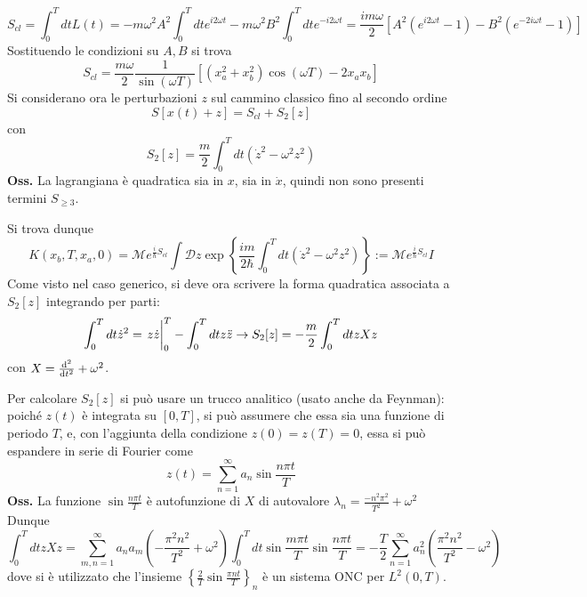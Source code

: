 $$S_{cl} = \int_{0}^{T}dt L(t) = -m\omega^2A^2\int_{0}^{T}dte^{i2\omega t} -
m\omega^2B^2\int_{0}^{T}dte^{-i2\omega t} =
\frac{im\omega}{2}\left[A^2(e^{i2\omega t} -1) - B^2(e^{-2i\omega t} -1)\right]$$
Sostituendo le condizioni su $A,B$ si trova
$$S_{cl}=\frac{m\omega}{2}\frac{1}{\sin(\omega T)}\left[(x_a^2+x_b^2)\cos(\omega T) - 2x_ax_b\right]$$
Si considerano ora le perturbazioni $z$ sul cammino classico fino al secondo ordine
$$S[x(t)+z] = S_{cl} + S_2[z]$$
con
$$S_2[z] = \frac{m}{2}\int_{0}^{T}dt(\dot z^2-\omega^2z^2)$$
\textbf{Oss.} La lagrangiana è quadratica sia in $x$, sia in $\dot x$, quindi non sono presenti
termini $S_{\geq3}$.

Si trova dunque
$$K(x_b,T,x_a,0) = \mathcal{M}e^{\frac{i}{\hbar}S_{cl}} \int\mathcal{D}z
\exp\left\{\frac{im}{2\hbar}\int_{0}^{T}dt (\dot z^2-\omega^2z^2)\right\} :=
\mathcal{M}e^{\frac{i}{\hbar}S_{cl}}I$$
Come visto nel caso generico, si deve ora scrivere la forma quadratica associata a $S_2[z]$ integrando
per parti:
$$\int_{0}^{T}dt \dot z^2 = \eval{z\dot z}_0^T - \int_{0}^{T}dtz\ddot z
\to S_2[z] = -\frac{m}{2}\int_{0}^{T}dt zXz$$
con $X = \dv[2]{}{t} + \omega^2$.

Per calcolare $S_2[z]$ si può usare un trucco analitico (usato anche da Feynman):
poiché $z(t)$ è integrata su $[0,T]$, si può assumere che essa sia una funzione di periodo $T$, e,
con l'aggiunta della condizione $z(0)=z(T)=0$, essa si può espandere in serie di Fourier come
$$z(t)=\sum_{n=1}^{\infty}a_n\sin\frac{n\pi t}{T}$$
\textbf{Oss.} La funzione $\sin\frac{n\pi t}{T}$ è autofunzione di $X$ di autovalore
$\lambda_n = \frac{-n^2\pi^2}{T^2} + \omega^2$\\
Dunque
$$\int_{0}^{T}dtzXz = \sum_{m,n=1}^{\infty}a_na_m\left(-\frac{\pi^2n^2}{T^2}+\omega^2\right)
\int_{0}^{T}dt\sin\frac{m\pi t}{T}\sin\frac{n\pi t}{T} =
-\frac{T}{2}\sum_{n=1}^{\infty}a_n^2\left(\frac{\pi^2n^2}{T^2}-\omega^2\right)$$
dove si è utilizzato che l'insieme $\left\{\frac{2}{T}\sin\frac{\pi nt}{T}\right\}_n$ è un sistema ONC
per $L^2(0,T)$.

